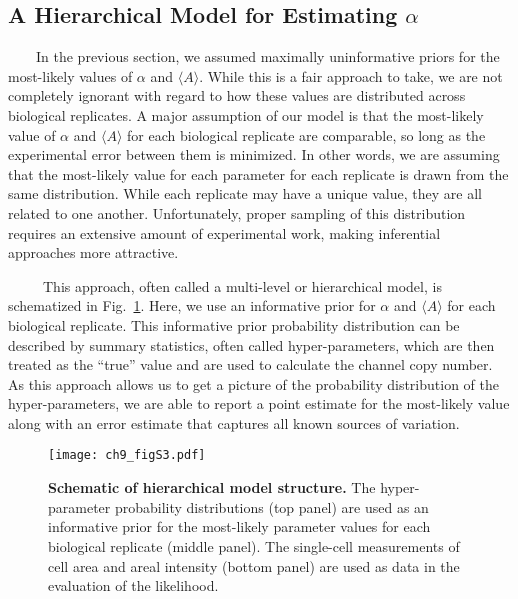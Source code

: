 \documentclass[12pt]{caltech_thesis}
\begin{document}
\hypertarget{a-hierarchical-model-for-estimating-alpha}{%
\subsection{\texorpdfstring{A Hierarchical Model for Estimating
\(\alpha\)}{A Hierarchical Model for Estimating \textbackslash alpha}}\label{a-hierarchical-model-for-estimating-alpha}}

~~~~In the previous section, we assumed maximally uninformative priors
for the most-likely values of \(\alpha\) and \(\langle A \rangle\).
While this is a fair approach to take, we are not completely ignorant
with regard to how these values are distributed across biological
replicates. A major assumption of our model is that the most-likely
value of \(\alpha\) and \(\langle A \rangle\) for each biological
replicate are comparable, so long as the experimental error between them
is minimized. In other words, we are assuming that the most-likely value
for each parameter for each replicate is drawn from the same
distribution. While each replicate may have a unique value, they are all
related to one another. Unfortunately, proper sampling of this
distribution requires an extensive amount of experimental work, making
inferential approaches more attractive.

~~~~~This approach, often called a multi-level or hierarchical model, is
schematized in Fig.~\ref{fig:hierarchical_model}. Here, we use an
informative prior for \(\alpha\) and \(\langle A \rangle\) for each
biological replicate. This informative prior probability distribution
can be described by summary statistics, often called hyper-parameters,
which are then treated as the ``true'' value and are used to calculate
the channel copy number. As this approach allows us to get a picture of
the probability distribution of the hyper-parameters, we are able to
report a point estimate for the most-likely value along with an error
estimate that captures all known sources of variation.

\hypertarget{fig:hierarchical_model}{%
\begin{figure}
\centering
\texttt{[image: ch9\_figS3.pdf]}
\caption[{Schematic of hierarchical model structure for estimating
MscL-sfGFP fluorescence calibration factor.}]{\textbf{Schematic of
hierarchical model structure.} The hyper-parameter probability
distributions (top panel) are used as an informative prior for the
most-likely parameter values for each biological replicate (middle
panel). The single-cell measurements of cell area and areal intensity
(bottom panel) are used as data in the evaluation of the likelihood.}
\label{fig:hierarchical_model}
\end{figure}
}
\end{document}
